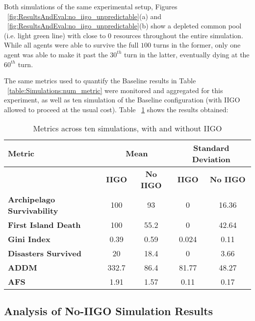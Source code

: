 Both simulations of the same experimental setup, Figures ~\ref{fig:ResultsAndEval:no_iigo_unpredictable}(a) and ~\ref{fig:ResultsAndEval:no_iigo_unpredictable}(b) show a depleted common pool (i.e. light green line) with close to 0 resources throughout the entire simulation. While all agents were able to survive the full $100$ turns in the former, only one agent was able to make it past the $30^{th}$ turn in the latter, eventually dying at the $60^{th}$ turn. 

The same metrics used to quantify the Baseline results in Table ~\ref{table:Simulations:num_metric} were monitored and aggregated for this experiment, as well as ten simulation of the Baseline configuration (with IIGO allowed to proceed at the usual cost). Table ~\ref{table:ResultsAndEval:iigo_vs_no_iigo} shows the results obtained:

\begin{table}[h]
    \centering
    \begin{tabular}{|l|c|c|c|c|}
    \hline
    \textbf{Metric}                     & \multicolumn{2}{c}{\textbf{Mean}}    & \multicolumn{2}{c}{\textbf{Standard Deviation}}   \\ \hline
                                        & \textbf{IIGO}      & \textbf{No IIGO}      &\textbf{IIGO}       & \textbf{No IIGO}                 \\ 
    \textbf{Archipelago Survivability}  & 100 & 93 & 0 & 16.36     \\
    \textbf{First Island Death}         & 100 & 55.2 & 0 & 42.64    \\
    \textbf{Gini Index}                 & 0.39 & 0.59 & 0.024 & 0.11   \\
    \textbf{Disasters Survived}         & 20 & 18.4 & 0 & 3.66    \\
    \textbf{ADDM}                       & 332.7 & 86.4 & 81.77 & 48.27    \\
    \textbf{AFS}                        & 1.91 & 1.57 & 0.11 & 0.17    \\ \hline
\end{tabular}
\caption{Metrics across ten simulations, with and without IIGO}
\label{table:ResultsAndEval:iigo_vs_no_iigo}
\end{table}


\subsection{Analysis of No-IIGO Simulation Results}
\label{subsec:ResultsAndEval:no-iigo:analysis_non_iigo_results}

